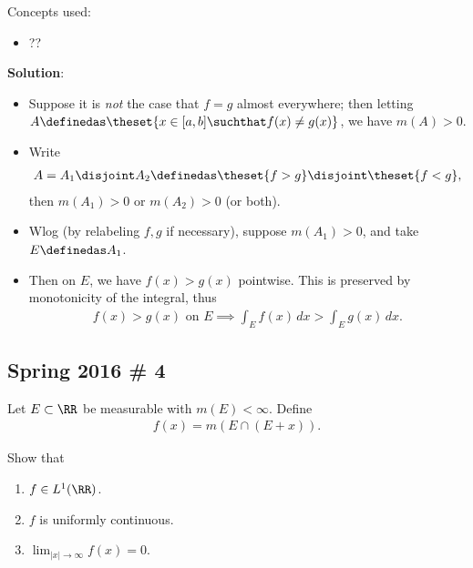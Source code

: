 \begin{solution}

Concepts used:

\begin{itemize}
\tightlist
\item
  ??
\end{itemize}

\textbf{Solution}:

\begin{itemize}
\item
  Suppose it is \emph{not} the case that \(f=g\) almost everywhere; then
  letting \(A\definedas \theset{x\in [a,b] \suchthat f(x) \neq g(x)}\),
  we have \(m(A) > 0\).
\item
  Write
  \begin{align*}  
  A = A_1\disjoint A_2 \definedas \theset{f>g} \disjoint \theset{f<g}
  ,\end{align*} then \(m(A_1) > 0\) or \(m(A_2) > 0\) (or both).
\item
  Wlog (by relabeling \(f, g\) if necessary), suppose \(m(A_1) > 0\),
  and take \(E\definedas A_1\).
\item
  Then on \(E\), we have \(f(x)>g(x)\) pointwise. This is preserved by
  monotonicity of the integral, thus
  \begin{align*}  
  f(x) > g(x) \text{ on } E \implies \int_{E} f(x)\,dx > \int_{E} g(x)\, dx 
  .\end{align*}
\end{itemize}

\end{solution}

\hypertarget{spring-2016-4}{%
\subsection{Spring 2016 \# 4}\label{spring-2016-4}}

Let \(E \subset \RR\) be measurable with \(m(E) < \infty\). Define
\begin{align*}
f(x)=m(E \cap(E+x)).
\end{align*}

Show that

\begin{enumerate}
\def\labelenumi{\arabic{enumi}.}
\tightlist
\item
  \(f\in L^1(\RR)\).
\item
  \(f\) is uniformly continuous.
\item
  \(\lim _{|x| \to \infty} f(x) = 0\).
\end{enumerate}

